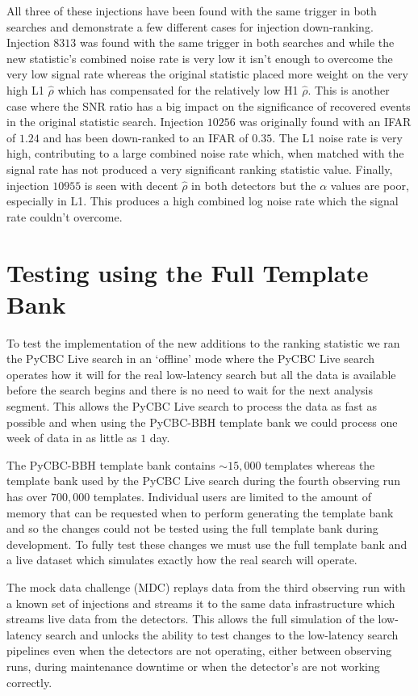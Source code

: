 %
All three of these injections have been found with the same trigger in both searches and demonstrate a few different cases for injection down-ranking. Injection $8313$ was found with the same trigger in both searches and while the new statistic's combined noise rate is very low it isn't enough to overcome the very low signal rate whereas the original statistic placed more weight on the very high L1 $\hat{\rho}$ which has compensated for the relatively low H1 $\hat{\rho}$. This is another case where the SNR ratio has a big impact on the significance of recovered events in the original statistic search. Injection $10256$ was originally found with an IFAR of $1.24$ and has been down-ranked to an IFAR of $0.35$. The L1 noise rate is very high, contributing to a large combined noise rate which, when matched with the signal rate has not produced a very significant ranking statistic value. Finally, injection $10955$ is seen with decent $\hat{\rho}$ in both detectors but the $\alpha$ values are poor, especially in L1. This produces a high combined log noise rate which the signal rate couldn't overcome. 

\section{\label{5:sec:mdc-test}Testing using the Full Template Bank}

To test the implementation of the new additions to the ranking statistic we ran the PyCBC Live search in an `offline' mode where the PyCBC Live search operates how it will for the real low-latency search but all the data is available before the search begins and there is no need to wait for the next analysis segment. This allows the PyCBC Live search to process the data as fast as possible and when using the PyCBC-BBH template bank we could process one week of \gwadj data in as little as $1$ day.

The PyCBC-BBH template bank contains $\sim15,000$ templates whereas the template bank used by the PyCBC Live search during the fourth observing run has over $700,000$ templates. Individual users are limited to the amount of memory that can be requested when to perform generating the template bank and so the changes could not be tested using the full template bank during development. To fully test these changes we must use the full template bank and a live dataset which simulates exactly how the real search will operate.

The \gwadj mock data challenge (MDC) replays data from the third observing run with a known set of injections and streams it to the same data infrastructure which streams live data from the \gwadj detectors. This allows the full simulation of the low-latency \gwadj search and unlocks the ability to test changes to the \gwadj low-latency search pipelines even when the \gwadj detectors are not operating, either between observing runs, during maintenance downtime or when the detector's are not working correctly.


